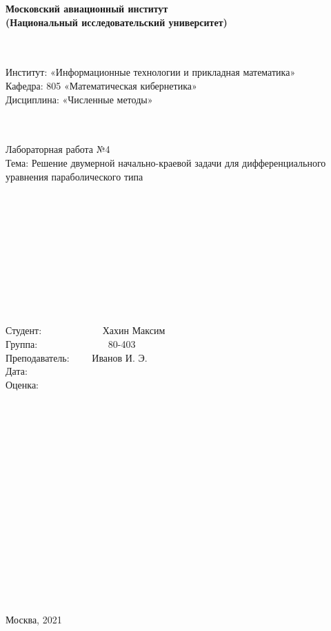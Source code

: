 \documentclass[12pt]{article}
\begin{document}
    \begin{center}
        \textbf{Московский авиационный институт} \\
        \textbf{(Национальный исследовательский университет)}
    \end{center} 
    ~\\
    ~\\
    Институт: «Информационные технологии и прикладная математика» \\
    Кафедра: 805 «Математическая кибернетика»  \\
    Дисциплина: «Численные методы»  
    ~\\
    ~\\
    ~\\
    \begin{center}
        Лабораторная работа №4 \\
        Тема: Решение двумерной начально-краевой задачи для дифференциального\\ уравнения 
        параболического типа
    \end{center}
    ~\\
    ~\\
    ~\\
    ~\\
    ~\\
    ~\\
    ~\\
    ~\\
    ~\\
    \begin{flushright}
        Студент: ~~~~~~~~~~~~Хахин Максим~~~~~~\\
        Группа: ~~~~~~~~~~~~~~80-403~~~~~~~~~~~~~~~~~\\
        Преподаватель: ~~~~Иванов И. Э.~~~~~~~\\
        Дата: ~~~~~~~~~~~~~~~~~~~~~~~~~~~~~~~~~~~~~~~~~~~\\
        Оценка: ~~~~~~~~~~~~~~~~~~~~~~~~~~~~~~~~~~~~~~~~\\
    \end{flushright}
    ~\\
    ~\\
    ~\\
    ~\\
    ~\\
    ~\\
    ~\\
    ~\\
    ~\\
    ~\\
    ~\\
    ~\\
    ~\\
    ~\\
    ~\\
    \begin{center}
        Москва, 2021
    \end{center}
    \pagestyle{empty}
    \newpage
\end{document}
